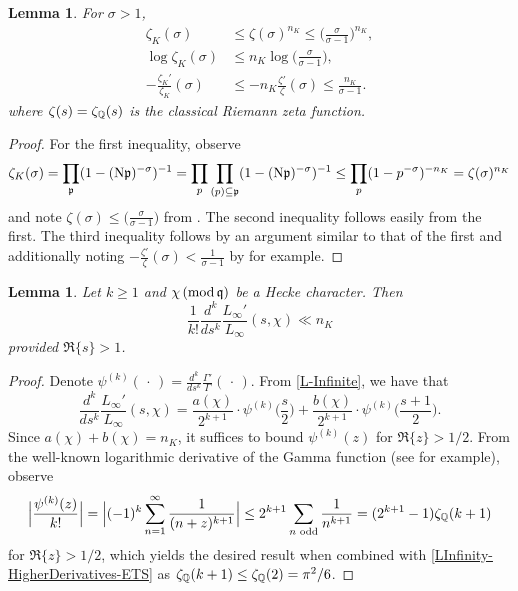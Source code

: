 \documentclass[12pt,psamsfonts]{amsart}
\newtheorem{lem}[thm]{Lemma}
\theoremstyle{definition}
\theoremstyle{remark}
\numberwithin{equation}{section}
\begin{document}
\begin{lem} For $\sigma > 1$, 
\begin{align*}
\zeta_K(\sigma) & \leq \zeta(\sigma)^{n_K} \leq \Big(\frac{\sigma}{\sigma-1}\Big)^{n_K}, \\
\log \zeta_K(\sigma) &  \leq n_K \log\Big(\frac{\sigma}{\sigma-1} \Big), \\
-\frac{\zeta_K'}{\zeta_K}(\sigma) & \leq -n_K \frac{\zeta'}{\zeta}(\sigma) \leq  \frac{n_K}{\sigma-1}. 
\end{align*}
where $\zeta(s) = \zeta_{\mathbb{Q}}(s)$ is the classical Riemann zeta function.
\label{LogDedekind}
\end{lem}
\begin{proof} For the first inequality, observe
\[
\zeta_K(\sigma) = \prod_{\mathfrak{p}} (1- (\mathrm{N}\mathfrak{p})^{-\sigma})^{-1} = \prod_{p} \prod_{(p) \subseteq \mathfrak{p}} (1- (\mathrm{N}\mathfrak{p})^{-\sigma})^{-1} \leq \prod_p (1-p^{-\sigma})^{-n_K} = \zeta(\sigma)^{n_K}
\]
and note $\zeta(\sigma) \leq \big( \frac{\sigma}{\sigma-1}\big)$ from \cite[Corollary 1.14]{MV}. The second inequality follows easily from the first. The third inequality follows by an argument similar to that of the first and additionally noting $-\frac{\zeta'}{\zeta}(\sigma) < \frac{1}{\sigma-1}$ by \cite[Lemma (a)]{Louboutin_1992} for example.
\end{proof}

\begin{lem} Let $k \geq 1$ and $\chi \, (\mathrm{mod} {\, \mathfrak{q}})$ be a Hecke character. Then
\[
\frac{1}{k!} \frac{d^k}{ds^k} \frac{L_{\infty}'}{L_{\infty}}(s,\chi)  \ll n_K
\]
provided $\Re\{s\} > 1$. 
\label{LInfinity-HigherDerivatives}
\end{lem}
\begin{proof} Denote $\psi^{(k)}(\, \cdot \, ) = \frac{d^k}{ds^k} \frac{\Gamma'}{\Gamma}(\, \cdot \,)$. From \eqref{L-Infinite}, we have that
\begin{equation}
\frac{d^k}{ds^k} \frac{L_{\infty}'}{L_{\infty}}(s,\chi) =\frac{a(\chi)}{2^{k+1}}   \cdot \psi^{(k)}\Big(\frac{s}{2} \Big)  +  \frac{b(\chi)}{2^{k+1}} \cdot \psi^{(k)}\Big( \frac{s+1}{2} \Big).
\label{LInfinity-HigherDerivatives-ETS}
\end{equation}
Since $a(\chi) + b(\chi) = n_K$, it suffices to bound $\psi^{(k)}(z)$ for $\Re\{z\} > 1/2$. From the well-known logarithmic derivative of the Gamma function (see \cite[(C.10)]{MV} for example), observe
\[
\Big| \frac{\psi^{(k)}(z)}{k!} \Big| 
= \Big| (-1)^k \sum_{n=1}^{\infty} \frac{1}{(n+z)^{k+1}}\Big| \leq 2^{k+1} \sum_{n \text{ odd} } \frac{1}{n^{k+1}} = (2^{k+1}-1)\zeta_{\mathbb{Q}}(k+1)
\]
for $\Re\{z\} > 1/2$, which yields the desired result when combined with \eqref{LInfinity-HigherDerivatives-ETS} as $\zeta_{\mathbb{Q}}(k+1) \leq \zeta_{\mathbb{Q}}(2) = \pi^2/6$. 
\end{proof}
\end{document}

